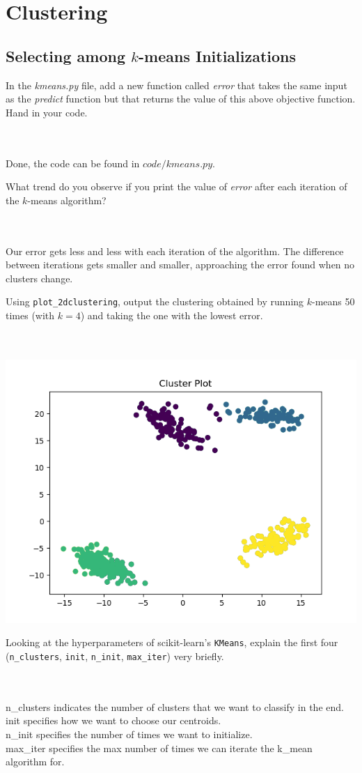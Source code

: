 \documentclass{article}
\def\blu#1{{\color{blu}#1}}
\def\enum#1{\begin{enumerate}#1\end{enumerate}}
\begin{document}
\section{Clustering}

\subsection{Selecting among $k$-means Initializations}

 {\enum{
 \blu{\item In the \emph{kmeans.py} file, add a new function called \emph{error} that takes the same input as the \emph{predict} function but that returns the value of this above objective function. Hand in your code.} \\\\ Done, the code can be found in $code/kmeans.py$.
 \blu{\item What trend do you observe if you print the value of \emph{error} after each iteration of the $k$-means algorithm?} \\\\ Our error gets less and less with each iteration of the algorithm. The difference between iterations gets smaller and smaller, approaching the error found when no clusters change.
 \blu{\item Using \texttt{plot\_2dclustering}, output the clustering obtained by running $k$-means 50 times (with $k=4$) and taking the one with the lowest error.} \\\\ \includegraphics{../figs/kmeans_3_1}
 \blu{\item Looking at the hyperparameters of scikit-learn's \texttt{KMeans}, explain the first four (\texttt{n\_clusters}, \texttt{init}, \texttt{n\_init}, \texttt{max\_iter}) very briefly.} \\\\ n\_clusters indicates the number of clusters that we want to classify in the end. \\init specifies how we want to choose our centroids. \\n\_init specifies the number of times we want to initialize. \\max\_iter specifies the max number of times we can iterate the k\_mean algorithm for.
 }}
\end{document}
